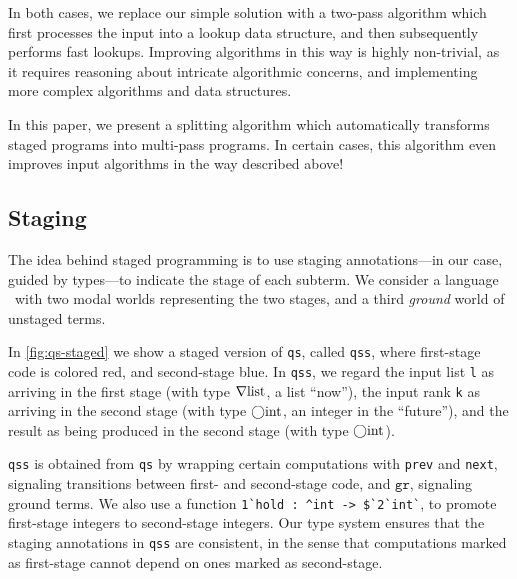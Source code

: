\begin{abstrsyn}
In both cases, we replace our simple solution with a two-pass algorithm which
first processes the input into a lookup data structure, and then subsequently
performs fast lookups. Improving algorithms in this way is highly non-trivial,
as it requires reasoning about intricate algorithmic concerns, and implementing
more complex algorithms and data structures.  

In this paper, we present a splitting algorithm which automatically transforms
staged programs into multi-pass programs. In certain cases, this algorithm even
improves input algorithms in the way described above!


\subsection{Staging}


The idea behind staged programming is to use staging annotations---in our case,
guided by types---to indicate the stage of each subterm. We consider a
language \lang\ with two modal worlds representing the two stages, and a third
{\em ground} world of unstaged terms.

In \ref{fig:qs-staged} we show a staged version of \texttt{qs}, called
\texttt{qss}, where first-stage code is colored red, and second-stage blue. In
\texttt{qss}, we regard the input list \texttt{l} as arriving in the first stage
(with type $\nabla\mathrm{list}$, a list ``now''), the input rank \texttt{k} as
arriving in the second stage (with type $\bigcirc{\rm int}$, an integer in the
``future''), and the result as being produced in the second stage (with type
$\bigcirc{\rm int}$).

\texttt{qss} is obtained from \texttt{qs} by wrapping certain computations with
\texttt{prev} and \texttt{next}, signaling transitions between first- and
second-stage code, and $\texttt{gr}$, signaling ground terms.  
%
We also use a function
\lstinline{1`hold : ^int -> $`2`int`},
to promote first-stage integers to second-stage integers.
%
Our type system ensures that the staging annotations in \texttt{qss} are
consistent, in the sense that computations marked as first-stage cannot depend
on ones marked as second-stage.


\end{abstrsyn}
